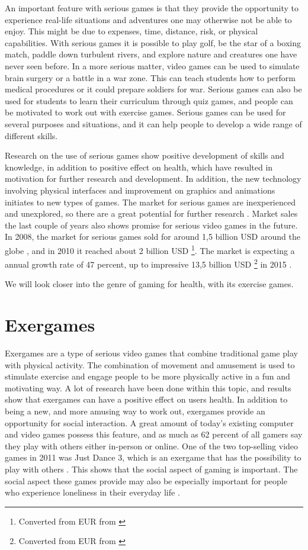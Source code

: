 An important feature with serious games is that they provide the opportunity to experience real-life situations and adventures one may otherwise not be able to enjoy. This might be due to expenses, time, distance, risk, or physical capabilities. With serious games it is possible to play golf, be the star of a boxing match, paddle down turbulent rivers, and explore nature and creatures one have never seen before. In a more serious matter, video games can be used to simulate brain surgery or a battle in a war zone. This can teach students how to perform medical procedures or it could prepare soldiers for war. Serious games can also be used for students to learn their curriculum through quiz games, and people can be motivated to work out with exercise games. Serious games can be used for several purposes and situations, and it can help people to develop a wide range of different skills. 

Research on the use of serious games show positive development of skills and knowledge, in addition to positive effect on health, which have resulted in motivation for further research and development. In addition, the new technology involving physical interfaces and improvement on graphics and animations initiates to new types of games. The market for serious games are inexperienced and unexplored, so there are a great potential for further research \cite{alfingewang}. Market sales the last couple of years also shows promise for serious video games in the future. In 2008, the market for serious games sold for around 1,5 billion USD around the globe \cite{alfingewang}, and in 2010 it reached about 2 billion USD \footnote{Converted from EUR from \cite{idate}}. The market is expecting a annual growth rate of 47 percent, up to impressive 13,5 billion USD \footnote{Converted from EUR from \cite{idate}} in 2015 \cite{idate}. 

We will look closer into the genre of gaming for health, with its exercise games.  

\section{Exergames}
\label{sec:exergames}
Exergames are a type of serious video games that combine traditional game play with physical activity. The combination of movement and amusement is used to stimulate exercise and engage people to be more physically active in a fun and motivating way. A lot of research have been done within this topic, and results show that exergames can have a positive effect on users health. In addition to being a new, and more amusing way to work out, exergames provide an opportunity for social interaction. A great amount of today's existing computer and video games possess this feature, and as much as 62 percent of all gamers say they play with others either in-person or online. One of the two top-selling video games in 2011 was Just Dance 3, which is an exergame that has the possibility to play with others \cite{statistics2012}. This shows that the social aspect of gaming is important. The social aspect these games provide may also be especially important for people who experience loneliness in their everyday life \cite{exergamesforelderly}.


